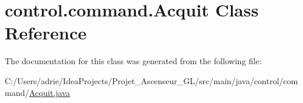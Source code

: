 \hypertarget{classcontrol_1_1command_1_1_acquit}{}\section{control.\+command.\+Acquit Class Reference}
\label{classcontrol_1_1command_1_1_acquit}


The documentation for this class was generated from the following file\+:\begin{DoxyCompactItemize}
\item 
C\+:/\+Users/adrie/\+Idea\+Projects/\+Projet\+\_\+\+Ascenseur\+\_\+\+G\+L/src/main/java/control/command/\mbox{\hyperlink{_acquit_8java}{Acquit.\+java}}\end{DoxyCompactItemize}
